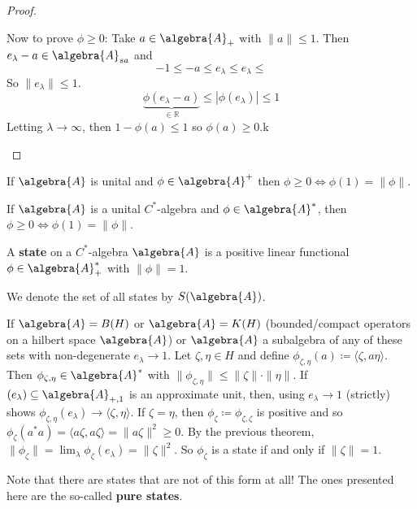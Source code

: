 \documentclass[a4paper]{article}
\begin{document}
\begin{proof}
\begin{enumerate}
		Now to prove $\phi \geq 0$: Take $a \in \algebra{A}_+$ with $\|a\| \leq 1$. Then $e_\lambda - a \in \algebra{A}_{sa}$ and 
		\begin{equation*}
			-1 \leq -a \leq e_\lambda \leq e_\lambda \leq 
		\end{equation*}
		So $\|e_\lambda\| \leq 1$.
		\begin{equation*}
			\underbrace{\phi(e_\lambda - a)}_{\in \mathds{R}} \leq |\phi(e_\lambda)| \leq 1
		\end{equation*}
		Letting $\lambda \to \infty$, then $1 - \phi(a)
		 \leq 1$ so $\phi(a) \geq 0$.k
	\end{enumerate}
\end{proof}


\begin{corollary}
	If $\algebra{A}$ is unital and $\phi \in \algebra{A}^+$ then $\phi \geq 0 \iff \phi(1) = \| \phi \|$.
\end{corollary}

\begin{corollary}

	If $\algebra{A}$ is a unital $C^*$-algebra and $\phi \in \algebra{A}^*$, then $\phi \geq 0 \iff \phi(1) = \|\phi\|$.
\end{corollary}

\begin{definition}
	A \textbf{state} on a $C^*$-algebra $\algebra{A}$ is a positive linear functional $\phi \in \algebra{A}_+^*$ with $\|\phi\| = 1$.

	We denote the set of all states by $S(\algebra{A})$.
\end{definition}

\begin{example}
	If $\algebra{A} = B(H)$ or $\algebra{A} = K(H)$ (bounded/compact operators on a hilbert space $\algebra{A}$) or $\algebra{A}$ a subalgebra of any of these sets with non-degenerate $e_\lambda \to 1$.
	Let $\zeta, \eta \in H$ and define $\phi_{\zeta, \eta}(a) \coloneq \langle \zeta, a \eta \rangle$.
	Then $\phi_{\zeta, \eta} \in \algebra{A}^*$ with $\|\phi_{\zeta, \eta}\| \leq \|\zeta\| \cdot \|\eta\|$.
	If $(e_\lambda) \subseteq \algebra{A}_{+, 1}$ is an approximate unit, then, using $e_\lambda \to 1$ (strictly) shows $\phi_{\zeta,\eta} (e_\lambda) \to \langle \zeta, \eta \rangle$.
	If $\zeta = \eta$, then $\phi_\zeta \coloneq \phi_{\zeta, \zeta}$ is positive and so $\phi_\zeta(a^* a) = \langle a \zeta, a \zeta \rangle = \|a \zeta \|^2 \geq 0$.
	By the previous theorem, $\|\phi_\zeta\|  = \lim_\lambda \phi_\zeta(e_\lambda) = \|\zeta\|^2$.
	So $\phi_\zeta$ is a state if and only if $\|\zeta\| = 1$.

	Note that there are states that are not of this form at all!
	The ones presented here are the so-called \textbf{pure states}.
\end{example}
\end{document}

